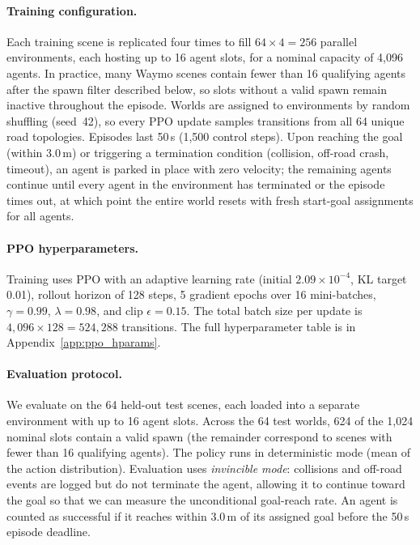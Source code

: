 \paragraph{Training configuration.}
Each training scene is replicated four times to fill $64 \times 4 = 256$ parallel environments, each hosting up to 16 agent slots, for a nominal capacity of 4{,}096 agents.
In practice, many Waymo scenes contain fewer than 16 qualifying agents after the spawn filter described below, so slots without a valid spawn remain inactive throughout the episode.
Worlds are assigned to environments by random shuffling (seed~42), so every PPO update samples transitions from all 64 unique road topologies.
Episodes last 50\,s (1{,}500 control steps).
Upon reaching the goal (within 3.0\,m) or triggering a termination condition (collision, off-road crash, timeout), an agent is parked in place with zero velocity; the remaining agents continue until every agent in the environment has terminated or the episode times out, at which point the entire world resets with fresh start-goal assignments for all agents.

\paragraph{PPO hyperparameters.}
Training uses PPO with an adaptive learning rate (initial $2.09{\times}10^{-4}$, KL target 0.01), rollout horizon of 128 steps, 5 gradient epochs over 16 mini-batches, $\gamma{=}0.99$, $\lambda{=}0.98$, and clip $\epsilon{=}0.15$.
The total batch size per update is $4{,}096 \times 128 = 524{,}288$ transitions.
The full hyperparameter table is in Appendix~\ref{app:ppo_hparams}.

\paragraph{Evaluation protocol.}
We evaluate on the 64 held-out test scenes, each loaded into a separate environment with up to 16 agent slots.
Across the 64 test worlds, 624 of the 1{,}024 nominal slots contain a valid spawn (the remainder correspond to scenes with fewer than 16 qualifying agents).
The policy runs in deterministic mode (mean of the action distribution).
Evaluation uses \emph{invincible mode}: collisions and off-road events are logged but do not terminate the agent, allowing it to continue toward the goal so that we can measure the unconditional goal-reach rate.
An agent is counted as successful if it reaches within 3.0\,m of its assigned goal before the 50\,s episode deadline.


